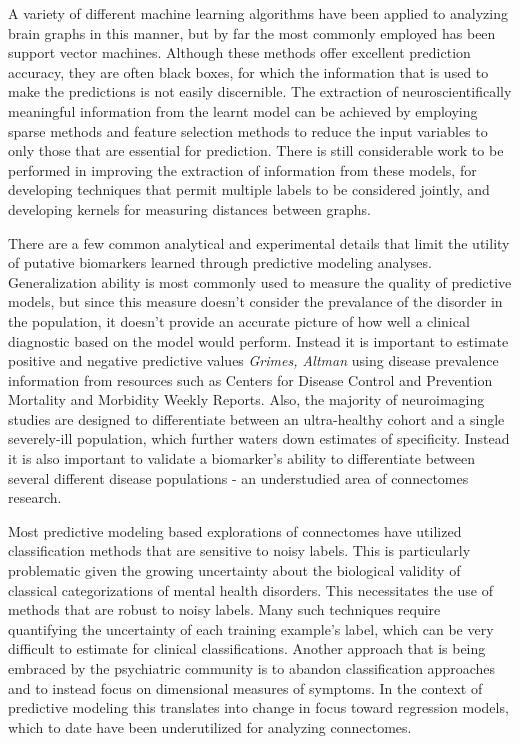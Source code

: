 A variety of different machine learning algorithms have been applied to analyzing brain graphs in this manner, but by far the most commonly employed has been support vector machines\cite{Castellanos2013}. Although these methods  offer excellent prediction accuracy, they are often black boxes, for which the information that is used to make the predictions is not easily discernible. The extraction of neuroscientifically meaningful information from the learnt model can be achieved by employing sparse methods\cite{Ryali2010} and feature selection methods\cite{Craddock2009} to reduce the input variables to only those that are essential for prediction\cite{Varoquaux2013}.  There is still considerable work to be performed in improving the extraction of information from these models, for developing techniques that permit multiple labels to be considered jointly, and developing kernels for measuring distances between graphs.

There are a few common analytical and experimental details that limit the utility of putative biomarkers learned through predictive modeling analyses.  Generalization ability is most commonly used to measure the quality of predictive models, but since this measure doesn't consider the prevalance of the disorder in the population, it doesn't provide an accurate picture of how well a clinical diagnostic based on the model would perform. Instead it is important to estimate positive and negative predictive values \emph{Grimes, Altman} using disease prevalence information from resources such as Centers for Disease Control and Prevention Mortality and Morbidity Weekly Reports. Also, the majority of neuroimaging studies are designed to differentiate between an ultra-healthy cohort and a single severely-ill population, which further waters down estimates of specificity. Instead it is also important to validate a biomarker's ability to differentiate between several different disease populations - an understudied area of connectomes research. 

Most predictive modeling based explorations of connectomes have utilized classification methods that are sensitive to noisy labels. This is particularly problematic given the growing uncertainty about the biological validity of classical categorizations of mental health disorders. This necessitates the use of methods that are robust to noisy labels. Many such techniques require quantifying the uncertainty of each training example's label, which can be very difficult to estimate for clinical classifications. Another approach that is being embraced by the psychiatric community is to abandon classification approaches and to instead focus on dimensional measures of symptoms. In the context of predictive modeling this translates into change in focus toward regression models, which to date have been underutilized for analyzing connectomes. 

